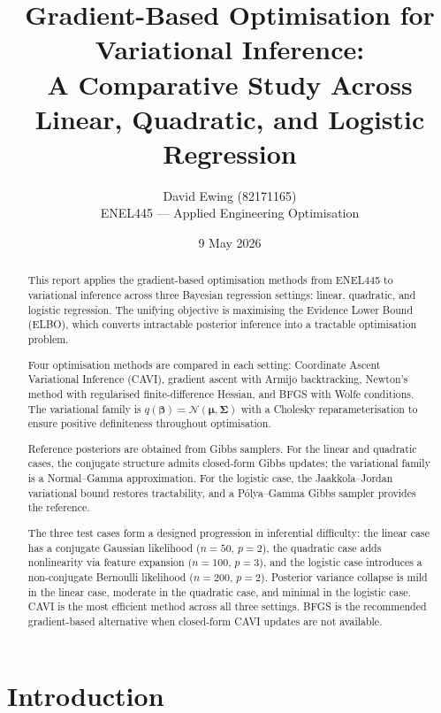 \documentclass[11pt,a4paper]{article}
\title{
Gradient-Based Optimisation for Variational Inference:\\
A Comparative Study Across Linear, Quadratic, and Logistic Regression
}
\author{
  David Ewing (82171165)\\
  ENEL445 --- Applied Engineering Optimisation
}
\date{9 May 2026}
\newcommand{\N}{\mathcal{N}}
\begin{document}
\maketitle

\begin{abstract}
\setlength{\parindent}{0pt}
\setlength{\parskip}{0.7em}

This report applies the gradient-based optimisation methods from ENEL445 to variational
inference across three Bayesian regression settings: linear, quadratic, and logistic
regression.
The unifying objective is maximising the Evidence Lower Bound (ELBO), which converts
intractable posterior inference into a tractable optimisation problem.

Four optimisation methods are compared in each setting: Coordinate Ascent Variational
Inference (CAVI), gradient ascent with Armijo backtracking, Newton's method with
regularised finite-difference Hessian, and BFGS with Wolfe conditions.
The variational family is $q(\bm{\beta}) = \N(\bm{\mu}, \bm{\Sigma})$ with a Cholesky
reparameterisation to ensure positive definiteness throughout optimisation.

Reference posteriors are obtained from Gibbs samplers.
For the linear and quadratic cases, the conjugate structure admits closed-form Gibbs
updates; the variational family is a Normal--Gamma approximation.
For the logistic case, the Jaakkola--Jordan \parencite{Jaakkola2000} variational bound
restores tractability, and a P\'{o}lya--Gamma Gibbs sampler \parencite{Polson2013}
provides the reference.

The three test cases form a designed progression in inferential difficulty:
the linear case has a conjugate Gaussian likelihood ($n=50$, $p=2$),
the quadratic case adds nonlinearity via feature expansion ($n=100$, $p=3$),
and the logistic case introduces a non-conjugate Bernoulli likelihood ($n=200$, $p=2$).
Posterior variance collapse is mild in the linear case, moderate in the quadratic case,
and minimal in the logistic case.
CAVI is the most efficient method across all three settings.
BFGS is the recommended gradient-based alternative when closed-form CAVI updates are
not available.
\end{abstract}

\newpage
\tableofcontents
\newpage

\section*{Introduction}
\end{document}
